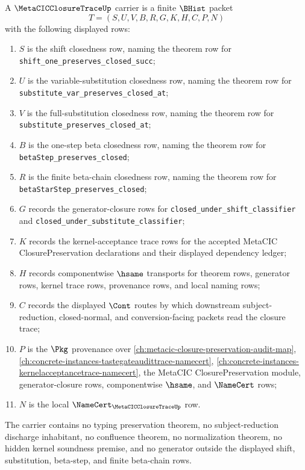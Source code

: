 \begin{definition}
\label{def:metacicclosuretrace-carrier}
A $\MetaCICClosureTraceUp$ carrier is a finite $\BHist$ packet
$$
T=(S,U,V,B,R,G,K,H,C,P,N)
$$
with the following displayed rows:
\begin{enumerate}
\item $S$ is the shift closedness row, naming the theorem row for \texttt{shift\_one\_preserves\_closed\_succ};
\item $U$ is the variable-substitution closedness row, naming the theorem row for \texttt{substitute\_var\_preserves\_closed\_at};
\item $V$ is the full-substitution closedness row, naming the theorem row for \texttt{substitute\_preserves\_closed\_at};
\item $B$ is the one-step beta closedness row, naming the theorem row for \texttt{betaStep\_preserves\_closed};
\item $R$ is the finite beta-chain closedness row, naming the theorem row for \texttt{betaStarStep\_preserves\_closed};
\item $G$ records the generator-closure rows for \texttt{closed\_under\_shift\_classifier} and \texttt{closed\_under\_substitute\_classifier};
\item $K$ records the kernel-acceptance trace rows for the accepted MetaCIC ClosurePreservation declarations and their displayed dependency ledger;
\item $H$ records componentwise $\hsame$ transports for theorem rows, generator rows, kernel trace rows, provenance rows, and local naming rows;
\item $C$ records the displayed $\Cont$ routes by which downstream subject-reduction, closed-normal, and conversion-facing packets read the closure trace;
\item $P$ is the $\Pkg$ provenance over \autoref{ch:metacic-closure-preservation-audit-map}, \autoref{ch:concrete-instances-tastegateaudittrace-namecert}, \autoref{ch:concrete-instances-kernelacceptancetrace-namecert}, the MetaCIC ClosurePreservation module, generator-closure rows, componentwise $\hsame$, and $\NameCert$ rows;
\item $N$ is the local $\NameCert_{\MetaCICClosureTraceUp}$ row.
\end{enumerate}
The carrier contains no typing preservation theorem, no subject-reduction discharge inhabitant, no confluence theorem, no normalization theorem, no hidden kernel soundness premise, and no generator outside the displayed shift, substitution, beta-step, and finite beta-chain rows.
\end{definition}

